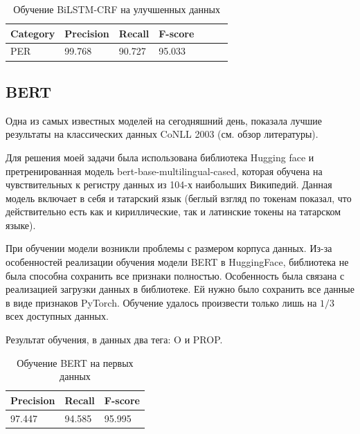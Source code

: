 \begin{table}[h]
\begin{tabular}{| l | l | l | l | l | l | l |}
\hline
Category               & Precision  &   Recall   &  F-score   \\

\hline
 PER                                 & 99.768     & 90.727     & 95.033      \\
\hline
\end{tabular}
\caption{Обучение BiLSTM-CRF на улучшенных данных}
\end{table}
\vspace{1cm}
\subsection{BERT}

\cite{DBLP:journals/corr/abs-1810-04805} Одна из самых известных моделей на сегодняшний день, показала лучшие результаты на классических данных CoNLL 2003 (см. обзор литературы).

Для решения моей задачи была использована библиотека Hugging face \cite{Wolf2019HuggingFacesTS} и претренированная модель bert-base-multilingual-cased, которая обучена на чувствительных к регистру данных из 104-х наибольших Википедий. Данная модель включает в себя и татарский язык (беглый взгляд по токенам показал, что действительно есть как и кириллические, так и латинские токены на татарском языке). 

При обучении модели возникли проблемы с размером корпуса данных. Из-за особенностей реализации обучения модели BERT в HuggingFace, библиотека не была способна сохранить все признаки полностью. Особенность была связана с реализацией загрузки данных в библиотеке. Ей нужно было сохранить все данные в виде признаков PyTorch. Обучение удалось произвести только лишь на $1/3$ всех доступных данных.

Результат обучения, в данных два тега: O и PROP.

\vspace{1cm}
\begin{table}[h]
\begin{tabular}{| l | l | l |}
\hline
Precision  &   Recall   &  F-score     \\

\hline
97.447     & 94.585    & 95.995        \\
\hline
\end{tabular}
\caption{Обучение BERT на первых данных}
\end{table}

